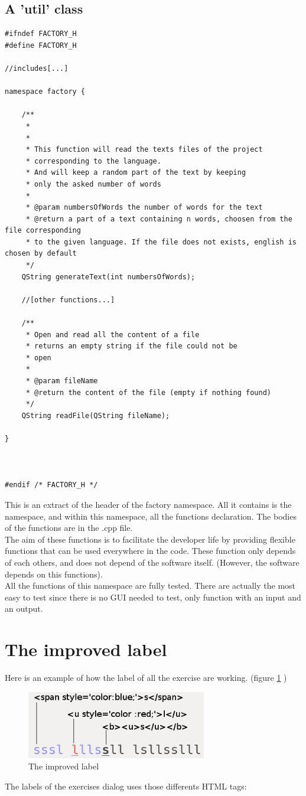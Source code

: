 \subsection{A 'util' class}

\begin{lstlisting}
#ifndef FACTORY_H
#define FACTORY_H

//includes[...]

namespace factory {
    
    /**
     * 
     * 
     * This function will read the texts files of the project
     * corresponding to the language.
     * And will keep a random part of the text by keeping 
     * only the asked number of words
     * 
     * @param numbersOfWords the number of words for the text
     * @return a part of a text containing n words, choosen from the file corresponding
     * to the given language. If the file does not exists, english is chosen by default
     */
    QString generateText(int numbersOfWords);

    //[other functions...]

    /**
     * Open and read all the content of a file
     * returns an empty string if the file could not be
     * open
     *
     * @param fileName
     * @return the content of the file (empty if nothing found)
     */
    QString readFile(QString fileName);

}



#endif /* FACTORY_H */
\end{lstlisting}
This is an extract of the header of the factory namespace. All it contains is the namespace, and within this namespace, all the functions declaration. The bodies of the functions are in the .cpp file.\\
The aim of these functions is to facilitate the developer life by providing flexible functions that can be used everywhere in the code. These function only depends of each others, and does not depend of the software itself. (However, the software depends on this functions).\\
All the functions of this namespace are fully tested. There are actually the most easy to test since there is no GUI needed to test, only function with an input and an output.


\section{The improved label}
Here is an example of how the label of all the exercise are working. (figure \ref{improved-label} )
\begin{figure}[H]
	\centering
	\includegraphics[width=0.7\textwidth]{images/dialog-learn-1.png}
	 \caption{The improved label}
	 \label{improved-label}
\end{figure}
The labels of the exercises dialog uses those differents HTML tags:

